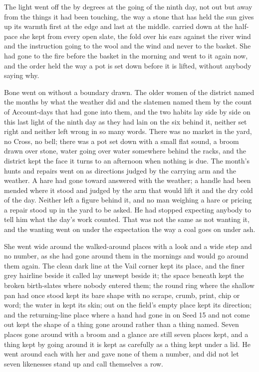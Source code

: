 The light went off the  by degrees at the going of the ninth day, not out but away from the things it had been touching, the way a stone that has held the sun gives up its warmth first at the edge and last at the middle.  carried  down at the half-pace she kept from every open slate, the fold over his ears against the river wind and the instruction going to the wool and the wind and never to the basket. She had gone to the fire before the basket in the morning and went to it again now, and the order held the way a pot is set down before it is lifted, without anybody saying why.

Bone went on without a boundary drawn. The older women of the district named the months by what the weather did and the slatemen named them by the count of Account-days that had gone into them, and the two habits lay side by side on this last light of the ninth day as they had lain on the six behind it, neither set right and neither left wrong in so many words. There was no market in the yard, no Cross, no bell; there was a pot set down with a small flat sound, a broom drawn over stone, water going over water somewhere behind the racks, and the district kept the face it turns to an afternoon when nothing is due. The month's hunts and repairs went on as directions judged by the carrying arm and the weather. A hare had gone toward  answered with the weather; a handle had been mended where it stood and judged by the arm that would lift it and the dry cold of the day. Neither left a figure behind it, and no man weighing a hare or pricing a repair stood up in the yard to be asked. He had stopped expecting anybody to tell him what the day's work counted. That was not the same as not wanting it, and the wanting went on under the expectation the way a coal goes on under ash.

She went wide around the walked-around places with a look and a wide step and no number, as she had gone around them in the mornings and would go around them again. The clean dark line at the Vail corner kept its place, and the finer grey hairline beside it called  lay unswept beside it; the space beneath  kept the broken birth-slates where nobody entered them; the round ring where the shallow pan had once stood kept its bare shape with no scrape, crumb, print, chip or word; the water in  kept its skin; out on  the field's empty place kept its direction; and the returning-line place where a hand had gone in on Seed 15 and not come out kept the shape of a thing gone around rather than a thing named. Seven places gone around with a broom and a glance are still seven places kept, and a thing kept by going around it is kept as carefully as a thing kept under a lid. He went around each with her and gave none of them a number, and did not let seven likenesses stand up and call themselves a row.

